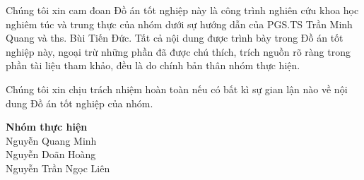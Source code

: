 Chúng tôi xin cam đoan Đồ án tốt nghiệp này là công trình nghiên cứu khoa học nghiêm túc và trung thực của nhóm dưới sự hướng dẫn của PGS.TS Trần Minh Quang và \acrshort{ths}. Bùi Tiến Đức. Tất cả nội dung được trình bày trong Đồ án tốt nghiệp này, ngoại trừ những phần đã được chú thích, trích nguồn rõ ràng trong phần tài liệu tham khảo, đều là do chính bản thân nhóm thực hiện.

\indent Chúng tôi xin chịu trách nhiệm hoàn toàn nếu có bất kì sự gian lận nào về nội dung Đồ án tốt nghiệp của nhóm.

\begin{flushright}
    \textbf{Nhóm thực hiện}\\
    Nguyễn Quang Minh \\
    Nguyễn Doãn Hoàng \\
    Nguyễn Trần Ngọc Liên \\
\end{flushright}